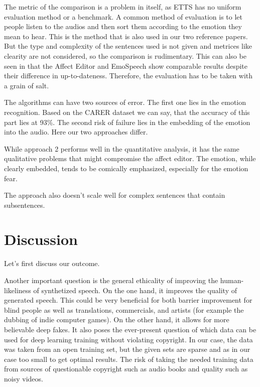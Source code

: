 \documentclass[11pt]{article}
\begin{document}
The metric of the comparison is a problem in itself, as ETTS has no uniform evaluation method or a benchmark. A common method of evaluation is to let people listen to the audios and then sort them according to the emotion they mean to hear. This is the method that is also used in our two reference papers. But the type and complexity of the sentences used is not given and metrices like clearity are not considered, so the comparison is rudimentary. This can also be seen in that the Affect Editor \cite{cahn_generation_2000} and EmoSpeech \cite{diatlova_emospeech_2023} show comparable results despite their difference in up-to-dateness. Therefore, the evaluation has to be taken with a grain of salt.

The algorithms can have two sources of error. The first one lies in the emotion recognition. Based on the CARER dataset \cite{saravia-etal-2018-carer} we can say, that the accuracy of this part lies at 93\%. The second risk of failure lies in the embedding of the emotion into the audio. Here our two approaches differ.


While approach 2 performs well in the quantitative analysis, it has the same qualitative problems that might compromise the affect editor. The emotion, while clearly embedded, tends to be comically emphasized, especially for the emotion fear.

The approach also doesn't scale well for complex sentences that contain subsentences.
\section{Discussion}
\label{discussion}
Let's first discuss our outcome.

Another important question is the general ethicality of improving the human-likeliness of synthetized speech. On the one hand, it improves the quality of generated speech. This could be very beneficial for both barrier improvement for blind people as well as translations, commercials, and artists (for example the dubbing of indie computer games). On the other hand, it allows for more believable deep fakes. It also poses the ever-present question of which data can be used for deep learning training without violating copyright. In our case, the data was taken from an open training set, but the given sets are sparse and as in our case too small to get optimal results\cite{he_improve_2022}. The risk of taking the needed training data from sources of questionable copyright such as audio books and quality such as noisy videos.
\end{document}
